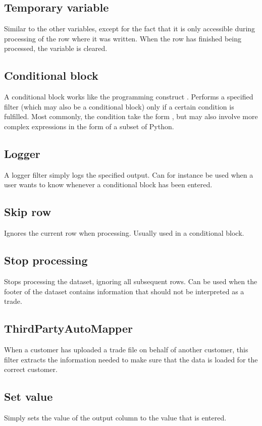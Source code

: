 \subsection{Temporary variable}
Similar to the other variables, except for the fact that it is only accessible during processing of the row where it was written. When the row has finished being
processed, the variable is cleared.

\subsection{Conditional block}
A conditional block works like the programming construct . Performs a specified filter (which may also be a conditional block) only if a certain
condition is fulfilled. Most commonly, the condition take the form , but may also involve more complex expressions in the form of a
subset of Python.

\subsection{Logger}
A logger filter simply logs the specified output. Can for instance be used when a user wants to know whenever a conditional block has been entered.

\subsection{Skip row}
Ignores the current row when processing. Usually used in a conditional block.

\subsection{Stop processing}
Stops processing the dataset, ignoring all subsequent rows. Can be used when the footer of the dataset contains information that should not be interpreted
as a trade.

\subsection{ThirdPartyAutoMapper}
When a customer has uploaded a trade file on behalf of another customer, this filter extracts the information needed to make sure that the data is loaded
for the correct customer.

\subsection{Set value}
Simply sets the value of the output column to the value that is entered.

